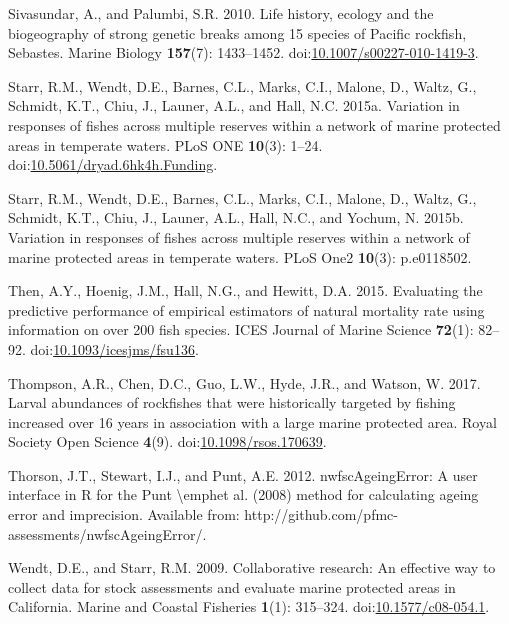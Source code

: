 \documentclass[11pt,
  english,
  letterpaper,
]{article}
\newlength{\cslhangindent}
\newenvironment{CSLReferences}[2] %
 {%
  \setlength{\parindent}{0pt}
  \ifodd #1 \everypar{\setlength{\hangindent}{\cslhangindent}}\ignorespaces\fi
  \ifnum #2 > 0
  \setlength{\parskip}{#2\baselineskip}
  \fi
 }%
 {}
\begin{document}
\begin{CSLReferences}{1}{0}
\leavevmode{}%
Sivasundar, A., and Palumbi, S.R. 2010. Life history, ecology and the biogeography of strong genetic breaks among 15 species of {Pacific} rockfish, {Sebastes}. Marine Biology \textbf{157}(7): 1433--1452. doi:\href{https://doi.org/10.1007/s00227-010-1419-3}{10.1007/s00227-010-1419-3}.

\leavevmode{}%
Starr, R.M., Wendt, D.E., Barnes, C.L., Marks, C.I., Malone, D., Waltz, G., Schmidt, K.T., Chiu, J., Launer, A.L., and Hall, N.C. 2015a. Variation in responses of fishes across multiple reserves within a network of marine protected areas in temperate waters. PLoS ONE \textbf{10}(3): 1--24. doi:\href{https://doi.org/10.5061/dryad.6hk4h.Funding}{10.5061/dryad.6hk4h.Funding}.

\leavevmode{}%
Starr, R.M., Wendt, D.E., Barnes, C.L., Marks, C.I., Malone, D., Waltz, G., Schmidt, K.T., Chiu, J., Launer, A.L., Hall, N.C., and Yochum, N. 2015b. Variation in responses of fishes across multiple reserves within a network of marine protected areas in temperate waters. PLoS One2 \textbf{10}(3): p.e0118502.

\leavevmode{}%
Then, A.Y., Hoenig, J.M., Hall, N.G., and Hewitt, D.A. 2015. Evaluating the predictive performance of empirical estimators of natural mortality rate using information on over 200 fish species. ICES Journal of Marine Science \textbf{72}(1): 82--92. doi:\href{https://doi.org/10.1093/icesjms/fsu136}{10.1093/icesjms/fsu136}.

\leavevmode{}%
Thompson, A.R., Chen, D.C., Guo, L.W., Hyde, J.R., and Watson, W. 2017. Larval abundances of rockfishes that were historically targeted by fishing increased over 16 years in association with a large marine protected area. Royal Society Open Science \textbf{4}(9). doi:\href{https://doi.org/10.1098/rsos.170639}{10.1098/rsos.170639}.

\leavevmode{}%
Thorson, J.T., Stewart, I.J., and Punt, A.E. 2012. {nwfscAgeingError}: A user interface in {R} for the {Punt} {\textbackslash{}}emphet al. (2008) method for calculating ageing error and imprecision. Available from: http://github.com/pfmc-assessments/nwfscAgeingError/.

\leavevmode{}%
Wendt, D.E., and Starr, R.M. 2009. Collaborative research: An effective way to collect data for stock assessments and evaluate marine protected areas in {California}. Marine and Coastal Fisheries \textbf{1}(1): 315--324. doi:\href{https://doi.org/10.1577/c08-054.1}{10.1577/c08-054.1}.


\end{CSLReferences}
\end{document}
